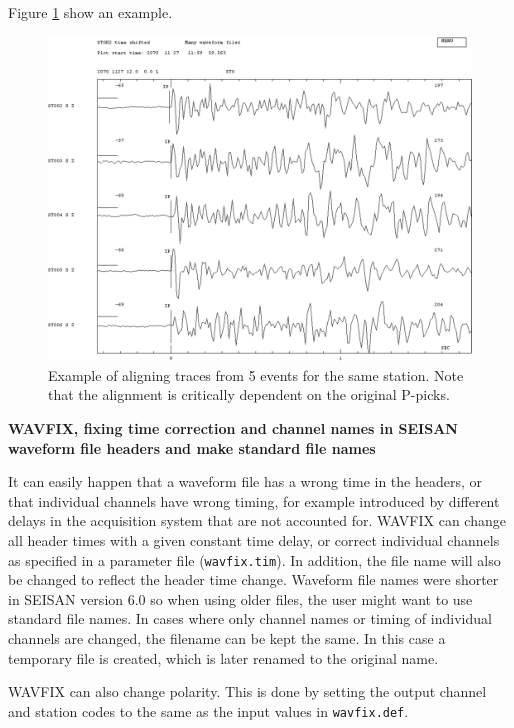 Figure \ref{fig:p_align} show an example.

\begin{figure}
\centerline{\includegraphics[width=0.9\linewidth]{fig/fig35}}
\caption{Example of aligning traces from 5 
events for the same station. Note that the alignment is critically 
dependent on the original P-picks.}
\label{fig:p_align}
\end{figure}

\textbf{WAVFIX, fixing time correction and channel names in SEISAN waveform file headers and make standard file names}

It can easily happen that a waveform file has a wrong time in the headers, or that individual channels have wrong timing, for example introduced by different delays in the acquisition system that are not accounted for. WAVFIX can change all header times with a given constant time delay, or correct individual channels as specified in a parameter file (\texttt{wavfix.tim}). In addition, the file name will also be changed to reflect the header time change. Waveform file names were shorter in SEISAN version 6.0 so when using older files, the user might want to use standard file names. In cases where only channel names or timing of individual channels are changed, the filename can be kept the same. In this case a temporary file is created, which is later renamed to the original name. 

WAVFIX can also change polarity. This is done by setting the output channel and station codes to the same as the input values in \texttt{wavfix.def}. 

